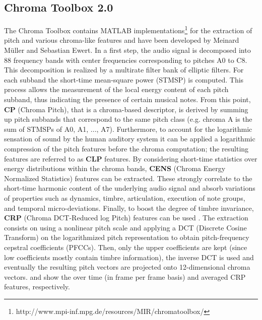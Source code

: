 \documentclass{article}
\begin{document}
\subsection{Chroma Toolbox 2.0}\label{subsec:chroma_toolbox} %
The Chroma Toolbox\cite{Author:Muller} contains MATLAB implementations\footnote{http://www.mpi-inf.mpg.de/resources/MIR/chromatoolbox/} for the extraction of pitch and various chroma-like features and have been developed by Meinard M{\"u}ller and Sebastian Ewert.
In a first step, the audio signal is decomposed into 88 frequency bands with center frequencies corresponding to pitches A0 to C8. This decomposition is realized by a multirate filter bank of elliptic filters. For each subband the short-time mean-square power (STMSP) is computed. This process allows the measurement of the local energy content of each pitch subband, thus indicating the presence of certain musical notes.
From this point, \textbf{CP} (Chroma Pitch), that is a chroma-based descriptor, is derived by summing up pitch subbands that correspond to the same pitch class (e.g. chroma A is the sum of STMSPs of A0, A1, ..., A7). Furthermore, to account for the logarithmic sensation of sound by the human auditory system it can be applied a logarithmic compression of the pitch features before the chroma computation; the resulting features are referred to as \textbf{CLP} features.
By considering short-time statistics over energy distributions within the chroma bands, \textbf{CENS} (Chroma Energy Normalized Statistics) features\cite{Author:Muller2} can be extracted. These strongly correlate to the short-time harmonic content of the underlying audio signal and absorb variations of properties such as dynamics, timbre, articulation, execution of note groups, and temporal micro-deviations.
Finally, to boost the degree of timbre invariance, \textbf{CRP} (Chroma DCT-Reduced log Pitch) features can be used . The extraction consists on using a nonlinear pitch scale and applying a DCT (Discrete Cosine Transform) on the logarithmized pitch representation to obtain pitch-frequency cepstral coefficients (PFCCs). Then, only the upper coefficients are kept (since low coefficients mostly contain timbre information), the inverse DCT is used and eventually the resulting pitch vectors are projected onto 12-dimensional chroma vectors.
 and  show the over time (in frame per frame basis) and averaged CRP features, respectively.
\end{document}
